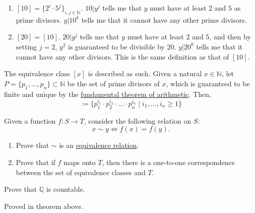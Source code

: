 \begin{solution}
\begin{enumerate}
      \item $[10] = \{2^i \cdot 5^j\}_{i, j \in \mathbb{N}}$. $10 | y^j$ tells me that $y$ must have at least $2$ and $5$ as prime divisors. $y | 10^k$ tells me that it cannot have any other prime divisors. 
      \item $[20] = [10]$. $20 | y^j$ tells me that $y$ must have at least $2$ and $5$, and then by setting $j = 2$, $y^2$ is guaranteed to be divisible by $20$. $y | 20^k$ tells me that it cannot have any other divisors. This is the same definition as that of $[10]$.  
    \end{enumerate}
    The equivalence class $[x]$ is described as such. Given a natural $x \in \mathbb{N}$, let $P = \{p_1, \ldots, p_n\} \subset \mathbb{N}$ be the set of prime divisors of $x$, which is guaranteed to be finite and unique by the \hyperref[alg-thm:fundamental-theorem-of-arithmetic]{fundamental theorem of arithmetic}. Then, 
    \begin{equation}
      [x] \coloneqq \{ p_1^{i_1} \cdot p_2^{i_2} \cdot \ldots \cdot p_n^{i_n} \mid i_1, \ldots, i_n \geq 1 \}
    \end{equation}
  \end{solution}

  \begin{exercise}
    Given a function $f: S \to T$, consider the following relation on $S$:
    \begin{equation}
      x \sim y \Leftrightarrow f(x) = f(y).
    \end{equation}
    \begin{enumerate}
      \item[(a)] Prove that $\sim$ is an \hyperref[def:equivalence_relation]{equivalence relation}.
      \item[(b)] Prove that if $f$ maps onto $T$, then there is a one-to-one correspondence between the set of equivalence classes and $T$.
    \end{enumerate}
  \end{exercise}
  
  \begin{exercise}
    Prove that $\mathbb{Q}$ is countable. 
  \end{exercise}
  \begin{solution}
    Proved in theorem above. 
  \end{solution}

